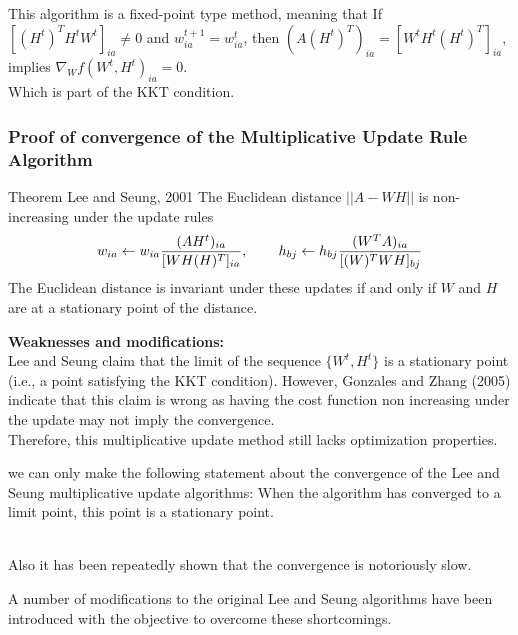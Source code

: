 \documentclass[aspectratio=169]{beamer}
\begin{document}
\begin{frame}
        This algorithm is a fixed-point type method, meaning that If $[(H^{t})^{T}H^{t}W^{t}]_{ia} \neq 0$ and
        $w_{ia}^{t+1} = w_{ia}^{t}$, then $(A(H^{t})^{T})_{ia} = [W^{t}H^{t}(H^{t})^{T}]_{ia}$, implies 
        $\nabla_{W}f(W^{t}, H^{t})_{ia} = 0$.\\
        Which is part of the KKT condition.
\end{frame}
\begin{frame}
    \frametitle{Proof of convergence of the Multiplicative Update Rule Algorithm}
    \begin{block}{Theorem Lee and Seung, 2001}
        The Euclidean distance $||A - WH||$ is non-increasing under the update rules
        \begin{align*}
            w_{ia} \gets w_{ia}\frac{(AH^{t})_{ia}}{[WH(H)^{T}]_{ia}}, \hspace{0.3in}
            h_{bj} \gets h_{bj}\frac{(W^{T}A)_{ia}}{[(W)^{T}WH]_{bj}} 
        \end{align*}
        The Euclidean distance is invariant under these updates if and only if $W$ and $H$ are at
        a stationary point of the distance.
    \end{block}
\end{frame}
\begin{frame}
    \textbf{Weaknesses and modifications:}\\
    Lee and Seung claim that the limit of the sequence $\{W^{t}, H^{t}\}$ is a 
    stationary point (i.e., a point satisfying the KKT condition). However, Gonzales and Zhang (2005)
    indicate that this claim is wrong as having  the cost function non increasing under the update 
    may not imply the convergence.\\
    Therefore, this multiplicative update method still lacks optimization properties.\\
\end{frame}
\begin{frame}
    we can only make the following statement about
    the convergence of the Lee and Seung multiplicative update algorithms: When the algorithm has converged to a
    limit point, this point is a stationary point.\\\
    
    Also it has been repeatedly shown that the convergence is notoriously slow.
    \end{frame}
    \begin{frame}
    A number of modifications to the original Lee and Seung algorithms have been
    introduced with the objective to overcome these shortcomings.\\
    \end{frame}
\end{document}
